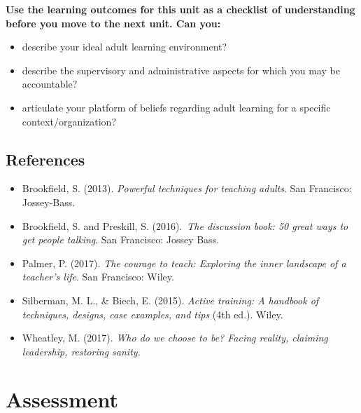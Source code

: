 \documentclass[
]{book}
\providecommand{\tightlist}{%
  \setlength{\itemsep}{0pt}\setlength{\parskip}{0pt}}
\begin{document}
\begin{progress}
\textbf{Use the learning outcomes for this unit as a checklist of understanding before you move to the next unit. Can you:}

\begin{itemize}
\tightlist
\item
  describe your ideal adult learning environment?\\
\item
  describe the supervisory and administrative aspects for which you may be accountable?\\
\item
  articulate your platform of beliefs regarding adult learning for a specific context/organization?
\end{itemize}
\end{progress}

\hypertarget{references-5}{%
\section*{References}\label{references-5}}

\begin{itemize}
\tightlist
\item
  Brookfield, S. (2013). \emph{Powerful techniques for teaching adults}. San Francisco: Jossey-Bass.\\
\item
  Brookfield, S. and Preskill, S. (2016).~\emph{The discussion book: 50 great ways to get people talking}. San Francisco: Jossey Bass.\\
\item
  Palmer, P. (2017). \emph{The courage to teach: Exploring the inner landscape of a teacher's life}. San Francisco: Wiley.\\
\item
  Silberman, M. L., \& Biech, E. (2015). \emph{Active training: A handbook of techniques, designs, case examples, and tips} (4th ed.). Wiley.\\
\item
  Wheatley, M. (2017). \emph{Who do we choose to be? Facing reality, claiming leadership, restoring sanity.}
\end{itemize}

\hypertarget{assessment-10}{%
\chapter*{Assessment}\label{assessment-10}}
\end{document}
